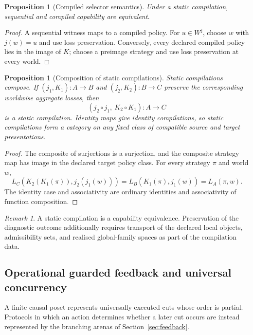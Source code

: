 \documentclass[11pt]{article}
\theoremstyle{plain}
\newtheorem{proposition}[theorem]{Proposition}
\theoremstyle{definition}
\theoremstyle{remark}
\newtheorem{remark}[theorem]{Remark}
\begin{document}
\begin{proposition}[Compiled selector semantics]\label{prop:FBcompile}
Under a static compilation, sequential and compiled capability are equivalent.
\end{proposition}

\begin{proof}
A sequential witness maps to a compiled policy. For $u\in W^\sharp$, choose
$w$ with $j(w)=u$ and use loss preservation. Conversely, every declared
compiled policy lies in the image of $K$; choose a preimage strategy and use
loss preservation at every world.
\end{proof}

\begin{proposition}[Composition of static compilations]
\label{prop:static-compilation-composition}
Static compilations compose. If
\((j_1,K_1):A\to B\) and \((j_2,K_2):B\to C\) preserve the corresponding
worldwise aggregate losses, then
\[
(j_2\circ j_1,\ K_2\circ K_1):A\to C
\]
is a static compilation. Identity maps give identity compilations, so static
compilations form a category on any fixed class of compatible source and target
presentations.
\end{proposition}

\begin{proof}
The composite of surjections is a surjection, and the composite strategy map has
image in the declared target policy class. For every strategy \(\pi\) and world
\(w\),
\[
L_C(K_2(K_1(\pi)),j_2(j_1(w)))
=L_B(K_1(\pi),j_1(w))
=L_A(\pi,w).
\]
The identity case and associativity are ordinary identities and associativity of
function composition.
\end{proof}

\begin{remark}
A static compilation is a capability equivalence. Preservation of the diagnostic
outcome additionally requires transport of the declared local objects,
admissibility sets, and realised global-family spaces as part of the compilation
data.
\end{remark}

\subsection{Operational guarded feedback and universal concurrency}

A finite causal poset represents universally executed cuts whose order is
partial. Protocols in which an action determines whether a later cut occurs are
instead represented by the branching arenas of Section~\ref{sec:feedback}.
\end{document}
